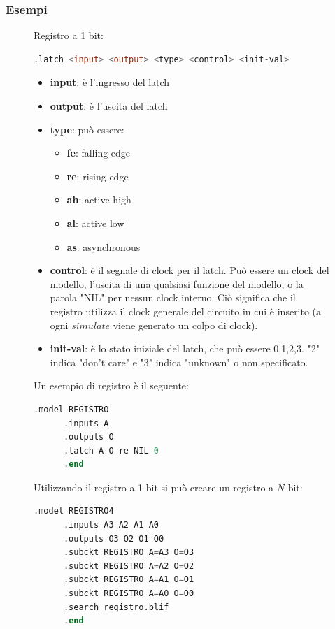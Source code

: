 \documentclass[a4paper]{article}
\theoremstyle{break}
\theoremstyle{break}
\theoremstyle{break}
\theoremstyle{break}
\begin{document}
\subsubsection{Esempi}
\begin{figure}[H]
  \begin{example}
    Registro a 1 bit:
    \begin{lstlisting}[language=Verilog]
      .latch <input> <output> <type> <control> <init-val>
    \end{lstlisting}
    \begin{itemize}
      \item \textbf{input}: è l'ingresso del latch
      \item \textbf{output}: è l'uscita del latch
      \item \textbf{type}: può essere:
        \begin{itemize}
          \item \textbf{fe}: falling edge
          \item \textbf{re}: rising edge
          \item \textbf{ah}: active high
          \item \textbf{al}: active low
          \item \textbf{as}: asynchronous
        \end{itemize}
      \item \textbf{control}: è il segnale di clock per il latch. Può essere un clock del modello,
        l'uscita di una qualsiasi funzione del modello, o la parola "NIL" per nessun clock
        interno. Ciò significa che il registro utilizza il clock generale del circuito in cui è
        inserito (a ogni \( simulate \) viene generato un colpo di clock).
      \item \textbf{init-val}: è lo stato iniziale del latch, che può essere 0,1,2,3. "2" indica
        "don't care" e "3" indica "unknown" o non specificato.
    \end{itemize}
    Un esempio di registro è il seguente:
    \begin{lstlisting}[language=Verilog]
      .model REGISTRO
      .inputs A
      .outputs O
      .latch A O re NIL 0
      .end
    \end{lstlisting}
    Utilizzando il registro a 1 bit si può creare un registro a \( N \) bit:
    \begin{lstlisting}[language=Verilog]
      .model REGISTRO4
      .inputs A3 A2 A1 A0
      .outputs O3 O2 O1 O0
      .subckt REGISTRO A=A3 O=O3
      .subckt REGISTRO A=A2 O=O2
      .subckt REGISTRO A=A1 O=O1
      .subckt REGISTRO A=A0 O=O0
      .search registro.blif
      .end
    \end{lstlisting}
  \end{example}
\end{figure}
\end{document}
